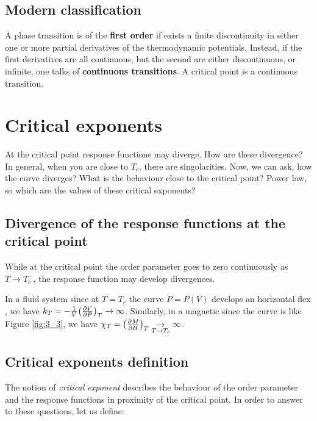 \documentclass[../../Main/Main.tex]{subfiles}
\begin{document}
\subsection{Modern classification}
A phase transition is of the \textbf{first order} if exists a finite discontinuity in either one or more partial derivatives of the thermodynamic potentials. Instead, if the first derivatives are all continuous, but the second are either discontinuous, or infinite, one talks of \textbf{continuous transitions}.
A critical point is a continuous transition.




\section{Critical exponents}

At the critical point response functions may diverge. How are these divergence?
In general, when you are close to \( T_c \), there are singolarities. Now, we can ask, how the curve diverges? What is the behaviour close to the critical point? Power law, so which are the values of these critical exponents?

\subsection{Divergence of the response functions at the critical point}
\label{sec:3_1}
While at the critical point the order parameter goes to zero continuously as \( T \rightarrow T_c^- \), the response function may develop divergences.
\begin{example}{}{}
In a fluid system since at \( T=T_c \) the curve \( P = P(V) \) develops an horizontal flex , we have \( k_T = -\frac{1}{V} \qty(\pdv{V}{P} )_T  \rightarrow \infty  \). Similarly, in a magnetic since the curve is like Figure \ref{fig:3_3}, we have \( \chi _T = \qty(\pdv{M}{H} )_T \underset{T \rightarrow  T_c}{\rightarrow } \infty   \).

\end{example}

\subsection{Critical exponents definition}

The notion of \emph{critical exponent} describes the behaviour of the order parameter and the response functions in proximity of the critical point.
In order to answer to these questions, let us define:
\end{document}
